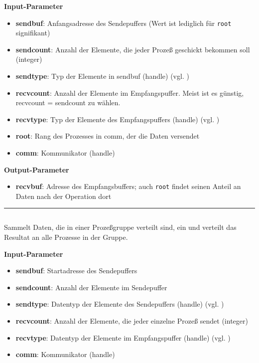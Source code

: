\textbf{Input-Parameter}
\begin{itemize}
    \item \textbf{sendbuf}: Anfangsadresse des Sendepuffers (Wert ist lediglich für \texttt{root} signifikant)
    \item \textbf{sendcount}: Anzahl der Elemente, die jeder Prozeß geschickt bekommen soll (integer)
    \item \textbf{sendtype}: Typ der Elemente in sendbuf (handle) (vgl. )
    \item \textbf{recvcount}: Anzahl der Elemente im Empfangspuffer. Meist ist es günstig, recvcount = sendcount zu wählen.
    \item \textbf{recvtype}: Typ der Elemente des Empfangspuffers (handle) (vgl. )
    \item \textbf{root}: Rang des Prozesses in comm, der die Daten versendet
    \item \textbf{comm}: Kommunikator (handle)
\end{itemize}

\textbf{Output-Parameter}
\begin{itemize}
    \item \textbf{recvbuf}: Adresse des Empfangsbuffers; auch \texttt{root} findet seinen Anteil an Daten nach der Operation dort
\end{itemize}
\goodbreak
\rule{\textwidth}{0.4pt}%
\inputminted[numbersep=5pt, tabsize=4]{c}{scripts/mpi/mpi-allgather.c}
Sammelt Daten, die in einer Prozeßgruppe verteilt sind, ein und verteilt das Resultat an alle Prozesse in der Gruppe.

\textbf{Input-Parameter}
\begin{itemize}
    \item \textbf{sendbuf}: Startadresse des Sendepuffers
    \item \textbf{sendcount}: Anzahl der Elemente im Sendepuffer
    \item \textbf{sendtype}: Datentyp der Elemente des Sendepuffers (handle) (vgl. )
    \item \textbf{recvcount}:  Anzahl der Elemente, die jeder einzelne Prozeß sendet (integer)
    \item \textbf{recvtype}: Datentyp der Elemente im Empfangspuffer (handle) (vgl. )
    \item \textbf{comm}: Kommunikator (handle)
\end{itemize}

